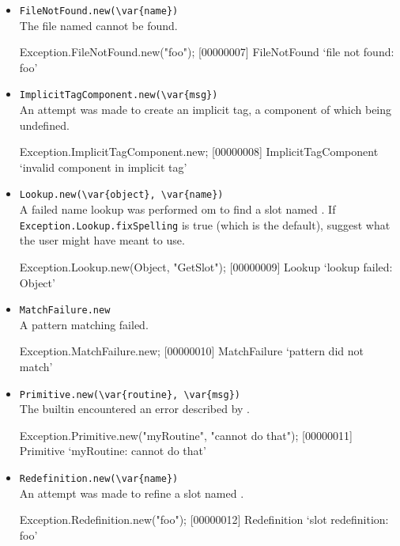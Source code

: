 \begin{itemize}
\item \lstinline|FileNotFound.new(\var{name})|\\
  The file named  cannot be found.
\begin{urbiscript}[firstnumber=last]
Exception.FileNotFound.new("foo");
[00000007] FileNotFound `file not found: foo'
\end{urbiscript}

\item \lstinline|ImplicitTagComponent.new(\var{msg})|\\
  An attempt was made to create an implicit tag, a component of which
  being undefined.
\begin{urbiscript}[firstnumber=last]
Exception.ImplicitTagComponent.new;
[00000008] ImplicitTagComponent `invalid component in implicit tag'
\end{urbiscript}

\item \lstinline|Lookup.new(\var{object}, \var{name})|\\
  A failed name lookup was performed om  to find a slot
  named .  If \lstinline|Exception.Lookup.fixSpelling| is
  true (which is the default), suggest what the user might have meant
  to use.
\begin{urbiscript}[firstnumber=last]
Exception.Lookup.new(Object, "GetSlot");
[00000009] Lookup `lookup failed: Object'
\end{urbiscript}

\item \lstinline|MatchFailure.new|\\
  A pattern matching failed.
\begin{urbiscript}[firstnumber=last]
Exception.MatchFailure.new;
[00000010] MatchFailure `pattern did not match'
\end{urbiscript}

\item \lstinline|Primitive.new(\var{routine}, \var{msg})|\\
  The builtin  encountered an error described by
  .
\begin{urbiscript}[firstnumber=last]
Exception.Primitive.new("myRoutine", "cannot do that");
[00000011] Primitive `myRoutine: cannot do that'
\end{urbiscript}

\item \lstinline|Redefinition.new(\var{name})|\\
  An attempt was made to refine a slot named .
\begin{urbiscript}[firstnumber=last]
Exception.Redefinition.new("foo");
[00000012] Redefinition `slot redefinition: foo'
\end{urbiscript}


\end{itemize}
